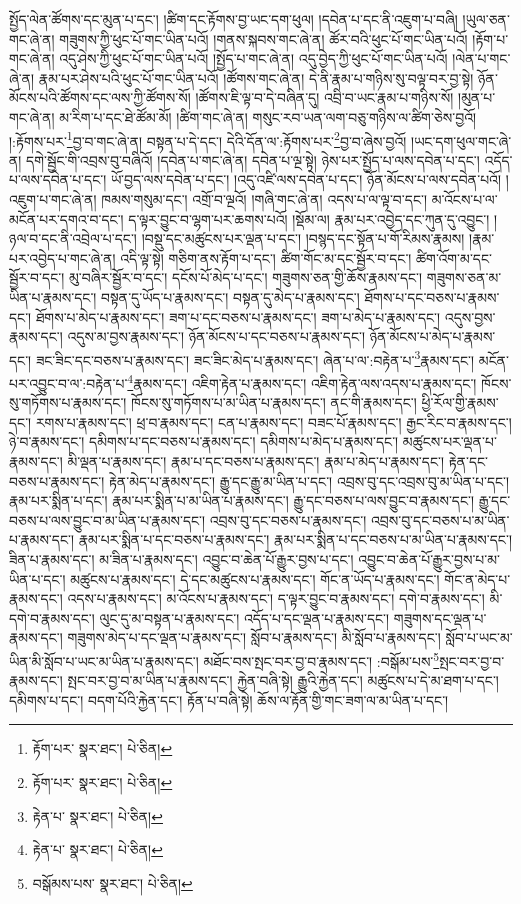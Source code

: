 སྤྱོད་ལེན་ཚོགས་དང་མུན་པ་དང་། །ཚིག་དང་རྟོགས་བྱ་ཡང་དག་ཕུལ། །དབེན་པ་དང་ནི་འཇུག་པ་བཞི། །ཡུལ་ཅན་གང་ཞེ་ན། གཟུགས་ཀྱི་ཕུང་པོ་གང་ཡིན་པའོ། །གནས་སྐབས་གང་ཞེ་ན། ཚོར་བའི་ཕུང་པོ་གང་ཡིན་པའོ། །རྟོག་པ་གང་ཞེ་ན། འདུ་ཤེས་ཀྱི་ཕུང་པོ་གང་ཡིན་པའོ། །སྤྱོད་པ་གང་ཞེ་ན། འདུ་བྱེད་ཀྱི་ཕུང་པོ་གང་ཡིན་པའོ། །ལེན་པ་གང་ཞེ་ན། རྣམ་པར་ཤེས་པའི་ཕུང་པོ་གང་ཡིན་པའོ། །ཚོགས་གང་ཞེ་ན། དེ་ནི་རྣམ་པ་གཉིས་སུ་བལྟ་བར་བྱ་སྟེ། ཉོན་མོངས་པའི་ཚོགས་དང་ལས་ཀྱི་ཚོགས་སོ། །ཚོགས་ཇི་ལྟ་བ་དེ་བཞིན་དུ། འབྲི་བ་ཡང་རྣམ་པ་གཉིས་སོ། །མུན་པ་གང་ཞེ་ན། མ་རིག་པ་དང་ཐེ་ཚོམ་མོ། །ཚིག་གང་ཞེ་ན། གསུང་རབ་ཡན་ལག་བཅུ་གཉིས་ལ་ཚིག་ཅེས་བྱའོ། །:རྟོགས་པར་\footnote{རྟོག་པར་  སྣར་ཐང་།  པེ་ཅིན། }བྱ་བ་གང་ཞེ་ན། བསྟན་པ་དེ་དང་། དེའི་དོན་ལ་:རྟོགས་པར་\footnote{རྟོག་པར་  སྣར་ཐང་།  པེ་ཅིན། }བྱ་བ་ཞེས་བྱའོ། །ཡང་དག་ཕུལ་གང་ཞེ་ན། དགེ་སྦྱོང་གི་འབྲས་བུ་བཞིའོ། །དབེན་པ་གང་ཞེ་ན། དབེན་པ་ལྔ་སྟེ། ཉེས་པར་སྤྱོད་པ་ལས་དབེན་པ་དང་། འདོད་པ་ལས་དབེན་པ་དང་། ཡོ་བྱད་ལས་དབེན་པ་དང་། །འདུ་འཛི་ལས་དབེན་པ་དང་། ཉོན་མོངས་པ་ལས་དབེན་པའོ། །འཇུག་པ་གང་ཞེ་ན། ཁམས་གསུམ་དང་། འགྲོ་བ་ལྔའོ། །གཞི་གང་ཞེ་ན། འདས་པ་ལ་ལྟ་བ་དང་། མ་འོངས་པ་ལ་མངོན་པར་དགའ་བ་དང་། ད་ལྟར་བྱུང་བ་ལྷག་པར་ཆགས་པའོ། །སྡོམ་ལ། རྣམ་པར་འབྱེད་དང་ཀུན་དུ་འབྱུང་། །ཉལ་བ་དང་ནི་འབྲེལ་པ་དང་། །བསྡུ་དང་མཚུངས་པར་ལྡན་པ་དང་། །བསྙད་དང་སྟོན་པ་གོ་རིམས་རྣམས། །རྣམ་པར་འབྱེད་པ་གང་ཞེ་ན། འདི་ལྟ་སྟེ། གཅིག་ནས་རྟོག་པ་དང་། ཚིག་གོང་མ་དང་སྦྱོར་བ་དང་། ཚིག་འོག་མ་དང་སྦྱོར་བ་དང་། མུ་བཞིར་སྦྱོར་བ་དང་། དངོས་པོ་མེད་པ་དང་། གཟུགས་ཅན་གྱི་ཆོས་རྣམས་དང་། གཟུགས་ཅན་མ་ཡིན་པ་རྣམས་དང་། བསྟན་དུ་ཡོད་པ་རྣམས་དང་། བསྟན་དུ་མེད་པ་རྣམས་དང་། ཐོགས་པ་དང་བཅས་པ་རྣམས་དང་། ཐོགས་པ་མེད་པ་རྣམས་དང་། ཟག་པ་དང་བཅས་པ་རྣམས་དང་། ཟག་པ་མེད་པ་རྣམས་དང་། འདུས་བྱས་རྣམས་དང་། འདུས་མ་བྱས་རྣམས་དང་། ཉོན་མོངས་པ་དང་བཅས་པ་རྣམས་དང་། ཉོན་མོངས་པ་མེད་པ་རྣམས་དང་། ཟང་ཟིང་དང་བཅས་པ་རྣམས་དང་། ཟང་ཟིང་མེད་པ་རྣམས་དང་། ཞེན་པ་ལ་:བརྟེན་པ་\footnote{རྟེན་པ་  སྣར་ཐང་།  པེ་ཅིན། }རྣམས་དང་། མངོན་པར་འབྱུང་བ་ལ་:བརྟེན་པ་\footnote{རྟེན་པ་  སྣར་ཐང་།  པེ་ཅིན། }རྣམས་དང་། འཇིག་རྟེན་པ་རྣམས་དང་། འཇིག་རྟེན་ལས་འདས་པ་རྣམས་དང་། ཁོངས་སུ་གཏོགས་པ་རྣམས་དང་། ཁོངས་སུ་གཏོགས་པ་མ་ཡིན་པ་རྣམས་དང་། ནང་གི་རྣམས་དང་། ཕྱི་རོལ་གྱི་རྣམས་དང་། རགས་པ་རྣམས་དང་། ཕྲ་བ་རྣམས་དང་། ངན་པ་རྣམས་དང་། བཟང་པོ་རྣམས་དང་། རྒྱང་རིང་བ་རྣམས་དང་། ཉེ་བ་རྣམས་དང་། དམིགས་པ་དང་བཅས་པ་རྣམས་དང་། དམིགས་པ་མེད་པ་རྣམས་དང་། མཚུངས་པར་ལྡན་པ་རྣམས་དང་། མི་ལྡན་པ་རྣམས་དང་། རྣམ་པ་དང་བཅས་པ་རྣམས་དང་། རྣམ་པ་མེད་པ་རྣམས་དང་། རྟེན་དང་བཅས་པ་རྣམས་དང་། རྟེན་མེད་པ་རྣམས་དང་། རྒྱུ་དང་རྒྱུ་མ་ཡིན་པ་དང་། འབྲས་བུ་དང་འབྲས་བུ་མ་ཡིན་པ་དང་། རྣམ་པར་སྨིན་པ་དང་། རྣམ་པར་སྨིན་པ་མ་ཡིན་པ་རྣམས་དང་། རྒྱུ་དང་བཅས་པ་ལས་བྱུང་བ་རྣམས་དང་། རྒྱུ་དང་བཅས་པ་ལས་བྱུང་བ་མ་ཡིན་པ་རྣམས་དང་། འབྲས་བུ་དང་བཅས་པ་རྣམས་དང་། འབྲས་བུ་དང་བཅས་པ་མ་ཡིན་པ་རྣམས་དང་། རྣམ་པར་སྨིན་པ་དང་བཅས་པ་རྣམས་དང་། རྣམ་པར་སྨིན་པ་དང་བཅས་པ་མ་ཡིན་པ་རྣམས་དང་། ཟིན་པ་རྣམས་དང་། མ་ཟིན་པ་རྣམས་དང་། འབྱུང་བ་ཆེན་པོ་རྒྱུར་བྱས་པ་དང་། འབྱུང་བ་ཆེན་པོ་རྒྱུར་བྱས་པ་མ་ཡིན་པ་དང་། མཚུངས་པ་རྣམས་དང་། དེ་དང་མཚུངས་པ་རྣམས་དང་། གོང་ན་ཡོད་པ་རྣམས་དང་། གོང་ན་མེད་པ་རྣམས་དང་། འདས་པ་རྣམས་དང་། མ་འོངས་པ་རྣམས་དང་། ད་ལྟར་བྱུང་བ་རྣམས་དང་། དགེ་བ་རྣམས་དང་། མི་དགེ་བ་རྣམས་དང་། ལུང་དུ་མ་བསྟན་པ་རྣམས་དང་། འདོད་པ་དང་ལྡན་པ་རྣམས་དང་། གཟུགས་དང་ལྡན་པ་རྣམས་དང་། གཟུགས་མེད་པ་དང་ལྡན་པ་རྣམས་དང་། སློབ་པ་རྣམས་དང་། མི་སློབ་པ་རྣམས་དང་། སློབ་པ་ཡང་མ་ཡིན་མི་སློབ་པ་ཡང་མ་ཡིན་པ་རྣམས་དང་། མཐོང་བས་སྤང་བར་བྱ་བ་རྣམས་དང་། :བསྒོམ་པས་\footnote{བསྒོམས་པས་  སྣར་ཐང་།  པེ་ཅིན། }སྤང་བར་བྱ་བ་རྣམས་དང་། སྤང་བར་བྱ་བ་མ་ཡིན་པ་རྣམས་དང་། རྐྱེན་བཞི་སྟེ། རྒྱུའི་རྐྱེན་དང་། མཚུངས་པ་དེ་མ་ཐག་པ་དང་། དམིགས་པ་དང་། བདག་པོའི་རྐྱེན་དང་། རྟོན་པ་བཞི་སྟེ། ཆོས་ལ་རྟོན་གྱི་གང་ཟག་ལ་མ་ཡིན་པ་དང་། 